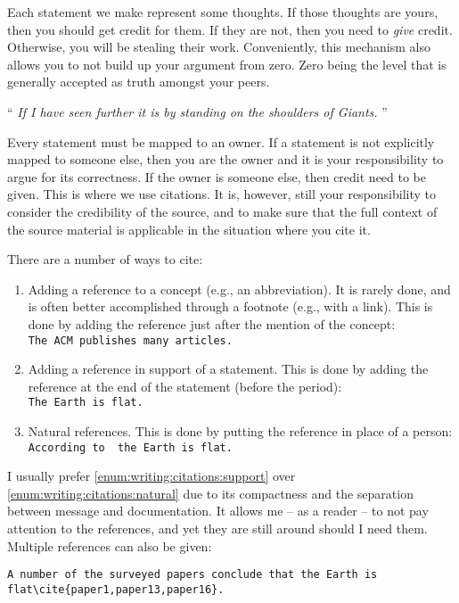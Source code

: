 \documentclass[a4paper, oneside]{memoir}
\newenvironment{inspiration}[2][0.9]
{
    \begin{center}
    \newcommand{\saveme}{#2}
    \begin{minipage}{#1\textwidth}
}
{
    
    \raggedleft{--- \textsl{\saveme}}
    \end{minipage}
    \end{center}
}
\newcommand{\idx}[1]{\index{#1}\marginpar{\raggedright \tiny #1}}
\begin{document}
Each statement we make represent some thoughts. If those thoughts are yours, then you should get credit\idx{Credit} for them. If they are not, then you need to \textsl{give} credit. Otherwise, you will be stealing their work. Conveniently, this mechanism also allows you to not build up your argument from zero. Zero being the level that is generally accepted as truth amongst your peers.

\begin{inspiration}{Isaac Newton\cite{Solr-dc-9792}}
  ``
    \textsl{If I have seen further it is by standing on the shoulders of Giants.}
  ''
\end{inspiration}

Every statement must be mapped to an owner. If a statement is not explicitly mapped to someone else, then you are the owner and it is your responsibility to argue for its correctness. If the owner is someone else, then credit need to be given. This is where we use citations. It is, however, still your responsibility to consider the credibility of the source, and to make sure that the full context of the source material is applicable in the situation where you cite it.

There are a number of ways to cite:
\begin{enumerate}
  \item Adding a reference to a concept (e.g., an abbreviation). It is rarely done, and is often better accomplished through a footnote (e.g., with a link). This is done by adding the reference just after the mention of the concept:
    \\
    \texttt{The ACM\cite{acm} publishes many articles.}
  \item \label{enum:writing:citations:support} Adding a reference in support of a statement. This is done by adding the reference at the end of the statement (before the period):
    \\
    \texttt{The Earth is flat\cite{source}.}
  \item  \label{enum:writing:citations:natural} Natural references. This is done by putting the reference in place of a person:
    \\
    \texttt{According to \cite{source} the Earth is flat.}
\end{enumerate}
I usually prefer \ref{enum:writing:citations:support} over \ref{enum:writing:citations:natural} due to its compactness and the separation between message and documentation. It allows me -- as a reader -- to not pay attention to the references, and yet they are still around should I need them. Multiple references can also be given:
\begin{verbatim}
A number of the surveyed papers conclude that the Earth is
flat\cite{paper1,paper13,paper16}.
\end{verbatim}
\end{document}

